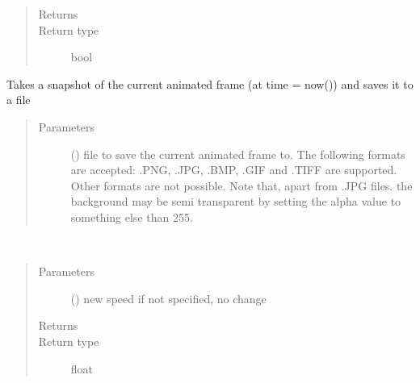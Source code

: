 \documentclass[letterpaper,10pt,english]{sphinxmanual}
\begin{document}
\begin{fulllineitems}
\begin{fulllineitems}
\begin{quote}
\begin{description}
\item[{Returns}] \leavevmode
{}

\item[{Return type}] \leavevmode
bool

\end{description}\end{quote}

\end{fulllineitems}


\begin{fulllineitems}
\label{\detokenize{Reference:salabim.Environment.snapshot}}
Takes a snapshot of the current animated frame (at time = now()) and saves it to a file
\begin{quote}\begin{description}
\item[{Parameters}] \leavevmode
{} () \textendash{} file to save the current animated frame to. 
The following formats are accepted: .PNG, .JPG, .BMP, .GIF and .TIFF are supported.
Other formats are not possible.
Note that, apart from .JPG files. the background may be semi transparent by setting
the alpha value to something else than 255.

\end{description}\end{quote}

\end{fulllineitems}


\begin{fulllineitems}
\label{\detokenize{Reference:salabim.Environment.speed}}~\begin{quote}\begin{description}
\item[{Parameters}] \leavevmode
{} () \textendash{} new speed 
if not specified, no change

\item[{Returns}] \leavevmode
{}

\item[{Return type}] \leavevmode
float


\end{description}
\end{quote}
\end{fulllineitems}
\end{fulllineitems}
\end{document}
